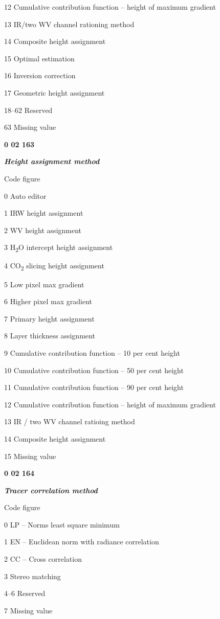 12 Cumulative contribution function -- height of maximum gradient

13 IR/two WV channel rationing method

14 Composite height assignment

15 Optimal estimation

16 Inversion correction

17 Geometric height assignment

18--62 Reserved

63 Missing value

\textbf{0 02 163}

\emph{\textbf{Height assignment method}}

Code figure

0 Auto editor

1 IRW height assignment

2 WV height assignment

3 H\textsubscript{2}O intercept height assignment

4 CO\textsubscript{2} slicing height assignment

5 Low pixel max gradient

6 Higher pixel max gradient

7 Primary height assignment

8 Layer thickness assignment

9 Cumulative contribution function -- 10 per cent height

10 Cumulative contribution function -- 50 per cent height

11 Cumulative contribution function -- 90 per cent height

12 Cumulative contribution function -- height of maximum gradient

13 IR / two WV channel ratioing method

14 Composite height assignment

15 Missing value

\textbf{0 02 164}

\emph{\textbf{Tracer correlation method}}

Code figure

0 LP -- Norms least square minimum

1 EN -- Euclidean norm with radiance correlation

2 CC -- Cross correlation

3 Stereo matching

4--6 Reserved

7 Missing value

